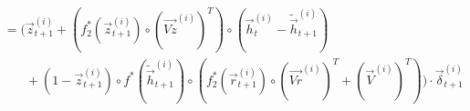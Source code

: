 \documentclass[12pt]{article}
\begin{document}
\begin{align*}
      &= (\overrightarrow{z}_{t+1}^{(i)} + (f_2^* (\overrightarrow{z}_{t+1}^{(i)}) \circ (\overrightarrow{Vz}^{(i)})^T) \circ (\overrightarrow{h}_{t}^{(i)} - \widetilde{\overrightarrow{h}}_{t+1}^{(i)}) \\
      &\phantom{{}= (} + (1 - \overrightarrow{z}_{t+1}^{(i)}) \circ f^*(\widetilde{\overrightarrow{h}}_{t+1}^{(i)}) \circ (f_2^* (\overrightarrow{r}_{t+1}^{(i)}) \circ (\overrightarrow{Vr}^{(i)})^T + (\overrightarrow{V}^{(i)})^T)) \cdot \overrightarrow{\delta}_{t+1}^{(i)} \\
    \end{align*}
\end{document}
